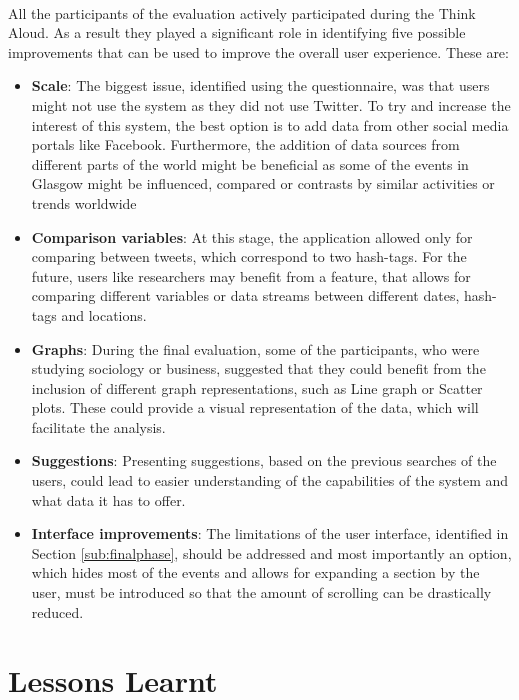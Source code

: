 \documentclass{l4proj}
\begin{document}
\paragraph{}
All the participants of the evaluation actively participated during the Think Aloud. As a result they played a significant role in identifying five possible improvements that can be used to improve the overall user experience. These are: 
\begin{itemize}
	\item \textbf{Scale}: The biggest issue, identified using the questionnaire, was that users might not use the system as they did not use Twitter. To try and increase the interest of this system, the best option is to add data from other social media portals like Facebook. Furthermore, the addition of data sources from different parts of the world might be beneficial as some of the events in Glasgow might be influenced, compared or contrasts by similar activities or trends worldwide 
	\item \textbf{Comparison variables}: At this stage, the application allowed only for comparing between tweets, which correspond to two hash-tags. For the future, users like researchers may benefit from a feature, that allows for comparing different variables or data streams between different dates, hash-tags and locations.
	\item \textbf{Graphs}: During the final evaluation, some of the participants, who were studying sociology or business, suggested that they could benefit from the inclusion of different graph representations, such as Line graph or Scatter plots. These could provide a visual representation of the data, which will facilitate the analysis.
	\item \textbf{Suggestions}: Presenting suggestions, based on the previous searches of the users, could lead to easier understanding of the capabilities of the system and what data it has to offer.
	\item \textbf{Interface improvements}: The limitations of the user interface, identified in Section \ref{sub:finalphase}, should be addressed and most importantly an option, which hides most of the events and allows for expanding a section by the user, must be introduced so that the amount of scrolling can be drastically reduced.    
\end{itemize}

\section{Lessons Learnt}
\end{document}
